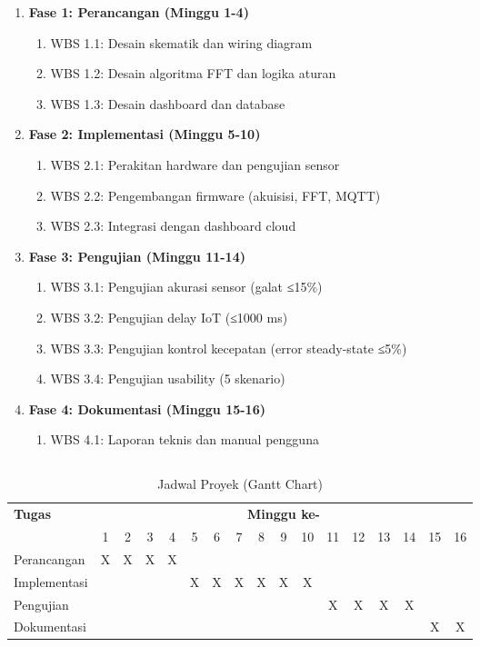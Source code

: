 \documentclass{elsinta}
\begin{document}
\begin{enumerate}
    \item \textbf{Fase 1: Perancangan (Minggu 1-4)}
    \begin{enumerate}
        \item WBS 1.1: Desain skematik dan wiring diagram
        \item WBS 1.2: Desain algoritma FFT dan logika aturan
        \item WBS 1.3: Desain dashboard dan database
    \end{enumerate}
    \item \textbf{Fase 2: Implementasi (Minggu 5-10)}
    \begin{enumerate}
        \item WBS 2.1: Perakitan hardware dan pengujian sensor
        \item WBS 2.2: Pengembangan firmware (akuisisi, FFT, MQTT)
        \item WBS 2.3: Integrasi dengan dashboard cloud
    \end{enumerate}
    \item \textbf{Fase 3: Pengujian (Minggu 11-14)}
    \begin{enumerate}
        \item WBS 3.1: Pengujian akurasi sensor (galat ≤15\%)
        \item WBS 3.2: Pengujian delay IoT (≤1000 ms)
        \item WBS 3.3: Pengujian kontrol kecepatan (error steady-state ≤5\%)
        \item WBS 3.4: Pengujian usability (5 skenario)
    \end{enumerate}
    \item \textbf{Fase 4: Dokumentasi (Minggu 15-16)}
    \begin{enumerate}
        \item WBS 4.1: Laporan teknis dan manual pengguna
    \end{enumerate}
\end{enumerate}

\subsection{\TimelineTitle}

\begin{table}[H]
\centering
\caption{Jadwal Proyek (Gantt Chart)}
\begin{tabular}{|l|c|c|c|c|c|c|c|c|c|c|c|c|c|c|c|c|}
\hline
\textbf{Tugas} & \multicolumn{16}{|c|}{\textbf{Minggu ke-}} \\
\cline{2-17}
 & 1 & 2 & 3 & 4 & 5 & 6 & 7 & 8 & 9 & 10 & 11 & 12 & 13 & 14 & 15 & 16 \\
\hline
Perancangan & X & X & X & X & & & & & & & & & & & & \\
Implementasi & & & & & X & X & X & X & X & X & & & & & & \\
Pengujian & & & & & & & & & & & X & X & X & X & & \\
Dokumentasi & & & & & & & & & & & & & & & X & X \\
\hline
\end{tabular}
\end{table}
\end{document}
